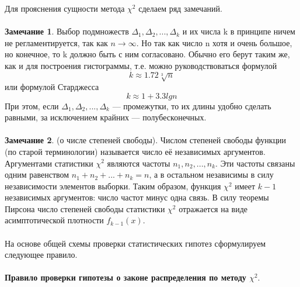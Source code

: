 \documentclass[../body.tex]{subfiles}
\begin{document}
	Для прояснения сущности метода $\chi^{2}$ сделаем ряд замечаний.
	\\\\
	\textbf{Замечание 1}. Выбор подмножеств $\Delta_{1},\Delta_{2}, ... ,\Delta_{k}$ и их числа k в принципе ничем не регламентируется, так как $n \rightarrow \infty$. Но так как число n хотя и очень большое, но конечное, то k должно быть с ним согласовано. Обычно его берут таким же, как и для построения гистограммы, т.е. можно руководствоваться формулой
	\begin{equation}
		k \approx 1.72\sqrt[3]{n}
		\label{k_1}
	\end{equation}
	или формулой Старджесса
	\begin{equation}
		k \approx 1 + 3.3lgn
	\end{equation}
	При этом, если  $\Delta_{1},\Delta_{2}, ... ,\Delta_{k}$ — промежутки, то их длины удобно сделать равными, за исключением крайних — полубесконечных.
	\\\\
	\textbf{Замечание 2}. (о числе степеней свободы).
	Числом степеней свободы функции (по старой терминологии) называется число её независимых аргументов. Аргументами статистики $\chi^{2}$ являются частоты $n_{1},n_{2}, ... ,n_{k}$. Эти частоты связаны одним равенством $n_{1} + n_{2} + ... + n_{k}  = n$, а в остальном независимы в силу независимости элементов выборки. Таким образом, функция $\chi^{2}$  имеет $k-1$ независимых аргументов: число частот минус одна связь. В силу теоремы Пирсона число степеней свободы статистики $\chi^{2}$  отражается на виде асимптотической плотности $f_{k - 1}(x)$.
	\\\\
	На основе общей схемы проверки статистических гипотез сформулируем следующее правило.
	\\\\
	\textbf{Правило проверки гипотезы о законе распределения по методу $\chi^{2}$}.
\end{document}
